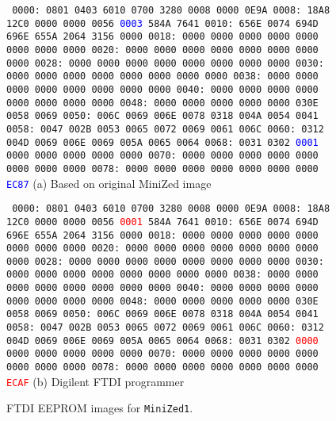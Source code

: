 %
\begin{figure}[t]
\begin{minipage}{0.5\textwidth}
\begin{center}
\footnotesize
{\tt
0000: 0801 0403 6010 0700 3280 0008 0000 0E9A
0008: 18A8 12C0 0000 0000 0056 \textcolor{blue}{0003} 584A 7641
0010: 656E 0074 694D 696E 655A 2064 3156 0000
0018: 0000 0000 0000 0000 0000 0000 0000 0000
0020: 0000 0000 0000 0000 0000 0000 0000 0000
0028: 0000 0000 0000 0000 0000 0000 0000 0000
0030: 0000 0000 0000 0000 0000 0000 0000 0000
0038: 0000 0000 0000 0000 0000 0000 0000 0000
0040: 0000 0000 0000 0000 0000 0000 0000 0000
0048: 0000 0000 0000 0000 0000 030E 0058 0069
0050: 006C 0069 006E 0078 0318 004A 0054 0041
0058: 0047 002B 0053 0065 0072 0069 0061 006C
0060: 0312 004D 0069 006E 0069 005A 0065 0064
0068: 0031 0302 \textcolor{blue}{0001} 0000 0000 0000 0000 0000
0070: 0000 0000 0000 0000 0000 0000 0000 0000
0078: 0000 0000 0000 0000 0000 0000 0000 \textcolor{blue}{EC87}}
\vskip3mm
(a) Based on original MiniZed image
\end{center}
\end{minipage}
\hfil
\begin{minipage}{0.5\textwidth}
\begin{center}
\footnotesize
{\tt
0000: 0801 0403 6010 0700 3280 0008 0000 0E9A
0008: 18A8 12C0 0000 0000 0056 \textcolor{red}{0001} 584A 7641
0010: 656E 0074 694D 696E 655A 2064 3156 0000
0018: 0000 0000 0000 0000 0000 0000 0000 0000
0020: 0000 0000 0000 0000 0000 0000 0000 0000
0028: 0000 0000 0000 0000 0000 0000 0000 0000
0030: 0000 0000 0000 0000 0000 0000 0000 0000
0038: 0000 0000 0000 0000 0000 0000 0000 0000
0040: 0000 0000 0000 0000 0000 0000 0000 0000
0048: 0000 0000 0000 0000 0000 030E 0058 0069
0050: 006C 0069 006E 0078 0318 004A 0054 0041
0058: 0047 002B 0053 0065 0072 0069 0061 006C
0060: 0312 004D 0069 006E 0069 005A 0065 0064
0068: 0031 0302 \textcolor{red}{0000} 0000 0000 0000 0000 0000
0070: 0000 0000 0000 0000 0000 0000 0000 0000
0078: 0000 0000 0000 0000 0000 0000 0000 \textcolor{red}{ECAF}}
\vskip3mm
(b) Digilent FTDI programmer
\end{center}
\end{minipage}
\caption{FTDI EEPROM images for \texttt{MiniZed1}.}
\label{fig:minized1_eeprom}
\end{figure}

